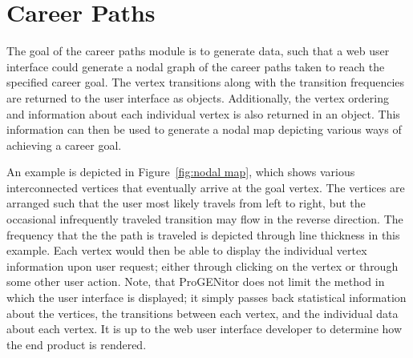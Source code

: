 \section{Career Paths}
\label{sect:career-paths}
The goal of the career paths module is to generate data, such that a web user
interface could generate a nodal graph of the career paths taken to reach the
specified career goal.  The vertex transitions along with the transition
frequencies are returned to the user interface as objects.  Additionally,
the vertex ordering and information about each individual vertex is also returned in
an object.  This information can then be used to generate a nodal map
depicting various ways of achieving a career goal.  

An example is depicted in Figure~\ref{fig:nodal map}, which shows various
interconnected vertices that eventually arrive at the goal vertex.  The vertices
are arranged such that the user most likely travels from left to right, but the
occasional infrequently traveled transition may flow in the reverse direction. 
The frequency that the the path is traveled is depicted through line thickness
in this example.  Each vertex would then be able to display the individual vertex
information upon user request; either through clicking on the vertex or through
some other user action.  Note, that ProGENitor does not limit the method in
which the user interface is displayed; it simply passes back statistical
information about the vertices, the transitions between each vertex, and the
individual data about each vertex.  It is up to the web user interface developer
to determine how the end product is rendered.


\usetikzlibrary{shapes,arrows,chains,decorations.markings}

